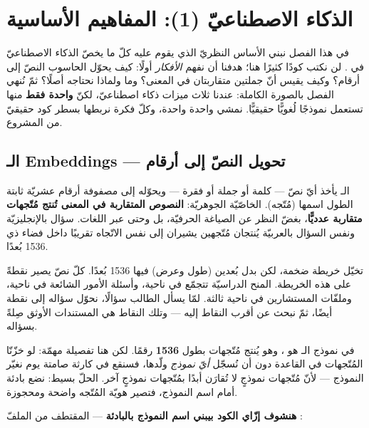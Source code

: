 \section{الذكاء الاصطناعيّ (1): المفاهيم الأساسية}

في هذا الفصل نبني الأساس النظريّ الذي يقوم عليه كلّ ما يخصّ الذكاء الاصطناعيّ في
. لن نكتب كودًا كثيرًا هنا؛ هدفنا أن نفهم \emph{الأفكار} أولًا:
كيف يحوّل الحاسوب النصّ إلى أرقام؟ وكيف يقيس أنّ جملتين متقاربتان في المعنى؟ وما
 ولماذا نحتاجه أصلًا؟ ثمّ نُنهي الفصل بالصورة الكاملة: عندنا ثلاث ميزات
ذكاء اصطناعيّ، لكنّ \textbf{واحدة فقط} منها تستعمل نموذجًا لُغويًّا حقيقيًّا. نمشي
واحدة واحدة، وكلّ فكرة نربطها بسطر كود حقيقيّ من المشروع.

\subsection{الـ Embeddings — تحويل النصّ إلى أرقام}

\begin{idea}
الـ  يأخذ أيّ نصّ — كلمة أو جملة أو فقرة — ويحوّله إلى مصفوفة أرقام
عشريّة ثابتة الطول اسمها  (مُتّجه). الخاصّيّة الجوهريّة: \textbf{النصوص
المتقاربة في المعنى تُنتج مُتّجهات متقاربة عدديًّا}، بغضّ النظر عن الصياغة الحرفيّة،
بل وحتى عبر اللغات. سؤال بالإنجليزيّة ونفس السؤال بالعربيّة يُنتجان مُتّجهين يشيران
إلى نفس الاتّجاه تقريبًا داخل فضاء ذي 1536 بُعدًا.
\end{idea}

تخيّل خريطة ضخمة، لكن بدل بُعدين (طول وعرض) فيها 1536 بُعدًا. كلّ نصّ يصير نقطةً على
هذه الخريطة. المنح الدراسيّة تتجمّع في ناحية، وأسئلة الأمور الشائعة في ناحية، وملفّات
المستشارين في ناحية ثالثة. لمّا يسأل الطالب سؤالًا، نحوّل سؤاله إلى نقطة أيضًا، ثمّ
نبحث عن أقرب النقاط إليه — وتلك النقاط هي المستندات الأوثق صِلةً بسؤاله.

في  نموذج الـ  هو 
، وهو يُنتج مُتّجهات بطول \textbf{1536} رقمًا. لكن هنا
تفصيلة مهمّة: لو خزّنّا المُتّجهات في القاعدة دون أن نُسجّل \emph{أيّ نموذج} ولّدها،
فسنقع في كارثة صامتة يوم نغيّر النموذج — لأنّ مُتّجهات نموذجٍ لا تُقارَن أبدًا
بمُتّجهات نموذجٍ آخر. الحلّ بسيط: نضع بادئة  أمام اسم النموذج، فتصير هويّة
المُتّجه واضحة ومحجوزة.

\textbf{هنشوف إزّاي الكود بيبني اسم النموذج بالبادئة } — المقتطف من الملفّ
:

